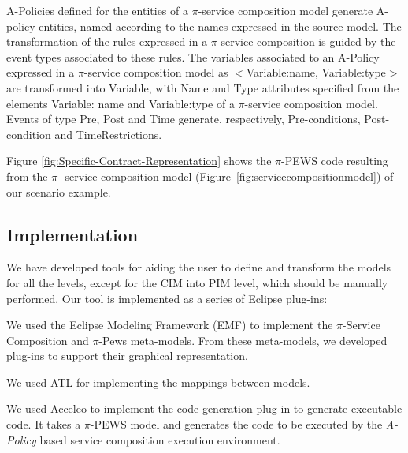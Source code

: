 \documentclass{singlecol-new}
\theoremstyle{TH}{
\newtheorem{lemma}{Lemma}
\newtheorem{theorem}[lemma]{Theorem}
\newtheorem{corrolary}[lemma]{Corrolary}
\newtheorem{conjecture}[lemma]{Conjecture}
\newtheorem{proposition}[lemma]{Proposition}
\newtheorem{claim}[lemma]{Claim}
\newtheorem{stheorem}[lemma]{Wrong Theorem}
\newtheorem{algorithm}{Algorithm}
}
\theoremstyle{THrm}{
\newtheorem{definition}{Definition}[section]
\newtheorem{question}{Question}[section]
\newtheorem{remark}{Remark}
\newtheorem{scheme}{Scheme}
}
\theoremstyle{THhit}{
\newtheorem{case}{Case}[section]
}
\theoremstyle{THhsl}{
\newtheorem{example}{Example}
}
\begin{document}
A-Policies defined for the entities of a $\pi$-service composition model generate {\sf A-policy} entities, named according to the names expres\-sed in the source model.
The transformation of the rules expres\-sed in a $\pi$-service composition is guided by the event types associated to these rules. 
The variables associated to an A-Policy expressed in a $\pi$-service composition model as {\sf $<$Variable:name, Variable:type$>$} are transformed into  {\sf Variable}, with  {\sf Name} and {\sf Type} attributes specified from the elements {\sf Variable: name} and {\sf Variable:type} of a $\pi$-service composition model.
%
Events of type {\sf Pre}, {\sf Post} and {\sf Time} generate, respectively, {\sf Pre-conditions}, {\sf Post-condition} and {\sf TimeRestrictions}.

\begin{example}\label{ex:toPublicMusicT6}
Figure \ref{fig:Specific-Contract-Representation} shows the $\pi$-PEWS code resulting from the $\pi$- service composition model (Figure~\ref{fig:servicecompositionmodel}) of our scenario example.
\end{example}


\subsection{Implementation}
We have developed tools for aiding the user to define and transform the models for all the levels, except for the CIM into PIM level, which should be manually performed.
Our tool is implemented as a series of Eclipse plug-ins: 
\begin{compactitem}
\item 	We  used the Eclipse Modeling Framework (EMF)\footnotemark {}   to implement the  $\pi$-Service Composition and $\pi$-{\sc Pews}  meta-models. 
From these meta-models, we  developed plug-ins to support their graphical representation.

\item	 We used  ATL\footnotemark {}
for implementing the  mappings between models.

\item 	We  used Acceleo\footnotemark {} to implement  the code generation plug-in to generate executable code. 
It takes a $\pi$-PEWS model and generates the code to be executed by the {\em
A-Policy} based service composition execution environment.
\end{compactitem}
\end{document}
